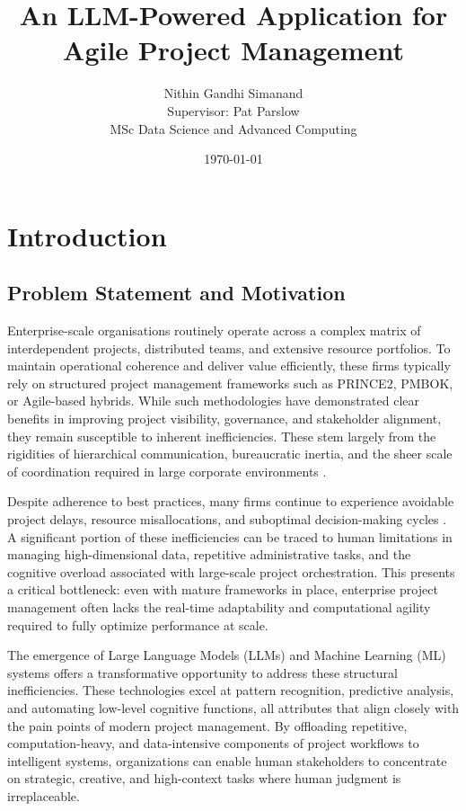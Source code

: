 \documentclass{report}
\title{\textbf{An LLM-Powered Application for Agile Project Management}}
\author{Nithin Gandhi Simanand \\ Supervisor: Pat Parslow \\ MSc Data Science and Advanced Computing}
\date{\today}
\begin{document}
\maketitle

\tableofcontents
\newpage

\chapter{Introduction}  %
\section{Problem Statement and Motivation}

Enterprise-scale organisations routinely operate across a complex matrix of interdependent projects, distributed teams, and extensive resource portfolios. To maintain operational coherence and deliver value efficiently, these firms typically rely on structured project management frameworks such as PRINCE2, PMBOK, or Agile-based hybrids. While such methodologies have demonstrated clear benefits in improving project visibility, governance, and stakeholder alignment, they remain susceptible to inherent inefficiencies. These stem largely from the rigidities of hierarchical communication, bureaucratic inertia, and the sheer scale of coordination required in large corporate environments \parencite{pricaEnhancingProjectEfficiency2025}.

Despite adherence to best practices, many firms continue to experience avoidable project delays, resource misallocations, and suboptimal decision-making cycles \parencite{mankinsTurningGreatStrategy}. A significant portion of these inefficiencies can be traced to human limitations in managing high-dimensional data, repetitive administrative tasks, and the cognitive overload associated with large-scale project orchestration. This presents a critical bottleneck: even with mature frameworks in place, enterprise project management often lacks the real-time adaptability and computational agility required to fully optimize performance at scale.

The emergence of Large Language Models (LLMs) and Machine Learning (ML) systems offers a transformative opportunity to address these structural inefficiencies. These technologies excel at pattern recognition, predictive analysis, and automating low-level cognitive functions, all attributes that align closely with the pain points of modern project management. By offloading repetitive, computation-heavy, and data-intensive components of project workflows to intelligent systems, organizations can enable human stakeholders to concentrate on strategic, creative, and high-context tasks where human judgment is irreplaceable.
\end{document}
